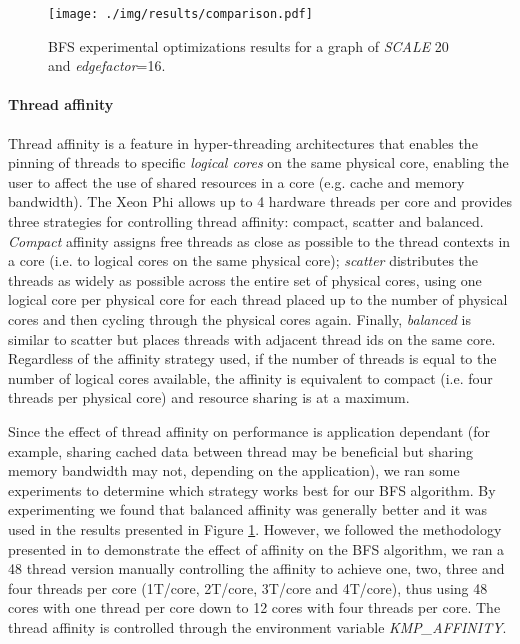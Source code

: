 \documentclass{sig-alternate-05-2015}
\begin{document}
\begin{figure}
\centering
\texttt{[image: ./img/results/comparison.pdf]}
\caption{BFS experimental optimizations results for a graph of \textit{SCALE} 20 and \textit{edgefactor}=16.}
\label{fig:noopt}
\vskip -6pt
\end{figure}


\paragraph{\textbf{Thread affinity}}
Thread affinity is a feature in hyper-threading architectures
that enables the pinning of threads to specific {\em logical cores} on
the same physical core, enabling the user to affect the use of shared
resources in a core (e.g. cache and memory bandwidth). The Xeon Phi
allows up to 4 hardware threads per core and provides three strategies
for controlling thread affinity: compact, scatter and balanced. {\em
  Compact} affinity assigns free threads as close as possible to the
thread contexts in a core (i.e. to logical cores on the same physical
core); {\em scatter} distributes the threads as widely as possible
across the entire set of physical cores, using one logical core per
physical core for each thread placed up to the number of physical cores
and then cycling through the physical cores again. Finally, {\em
  balanced} is similar to scatter but places threads with adjacent
thread ids on the same core. Regardless of the affinity strategy used,
if the number of threads is equal to the number of logical cores
available, the affinity is equivalent to compact (i.e. four threads
per physical core) and resource sharing is at a maximum.

Since the effect of thread affinity on performance is
application dependant (for example, sharing cached data between thread
may be beneficial but sharing memory bandwidth may not, depending on
the application), we ran some experiments to determine which strategy
works best for our BFS algorithm. By experimenting we found that
balanced affinity was generally better and it was used in the results
presented in Figure \ref{fig:noopt}. However, we followed the methodology presented in \cite{RodchenkoNPL15} to demonstrate the
effect of affinity on the BFS algorithm, we ran a 48 thread version
manually controlling the affinity to achieve one, two, three and four
threads per core (1T/core, 2T/core, 3T/core and 4T/core), thus using 48
cores with one thread per core down to 12 cores with four threads per
core. The thread affinity is controlled through the environment
variable \textit{KMP\_AFFINITY}.
\clearpage
\end{document}
